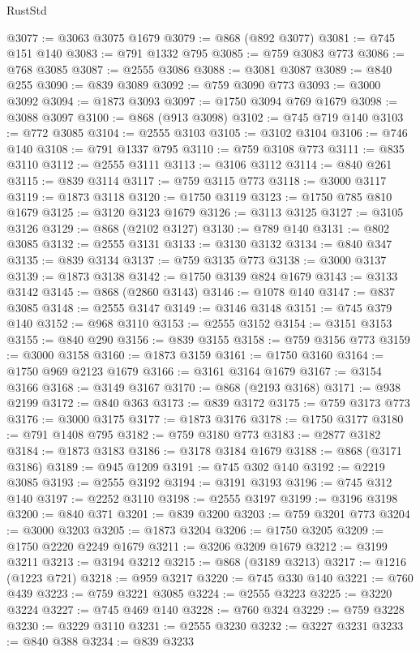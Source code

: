 \begin{lexlean}{RustStd}
\begin{coremodule}
@3077 := @3063 @3075 @1679
@3079 := @868 (@892 @3077)
@3081 := @745 @151 @140
@3083 := @791 @1332 @795
@3085 := @759 @3083 @773
@3086 := @768 @3085
@3087 := @2555 @3086
@3088 := @3081 @3087
@3089 := @840 @255
@3090 := @839 @3089
@3092 := @759 @3090 @773
@3093 := @3000 @3092
@3094 := @1873 @3093
@3097 := @1750 @3094 @769 @1679
@3098 := @3088 @3097
@3100 := @868 (@913 @3098)
@3102 := @745 @719 @140
@3103 := @772 @3085
@3104 := @2555 @3103
@3105 := @3102 @3104
@3106 := @746 @140
@3108 := @791 @1337 @795
@3110 := @759 @3108 @773
@3111 := @835 @3110
@3112 := @2555 @3111
@3113 := @3106 @3112
@3114 := @840 @261
@3115 := @839 @3114
@3117 := @759 @3115 @773
@3118 := @3000 @3117
@3119 := @1873 @3118
@3120 := @1750 @3119
@3123 := @1750 @785 @810 @1679
@3125 := @3120 @3123 @1679
@3126 := @3113 @3125
@3127 := @3105 @3126
@3129 := @868 (@2102 @3127)
@3130 := @789 @140
@3131 := @802 @3085
@3132 := @2555 @3131
@3133 := @3130 @3132
@3134 := @840 @347
@3135 := @839 @3134
@3137 := @759 @3135 @773
@3138 := @3000 @3137
@3139 := @1873 @3138
@3142 := @1750 @3139 @824 @1679
@3143 := @3133 @3142
@3145 := @868 (@2860 @3143)
@3146 := @1078 @140
@3147 := @837 @3085
@3148 := @2555 @3147
@3149 := @3146 @3148
@3151 := @745 @379 @140
@3152 := @968 @3110
@3153 := @2555 @3152
@3154 := @3151 @3153
@3155 := @840 @290
@3156 := @839 @3155
@3158 := @759 @3156 @773
@3159 := @3000 @3158
@3160 := @1873 @3159
@3161 := @1750 @3160
@3164 := @1750 @969 @2123 @1679
@3166 := @3161 @3164 @1679
@3167 := @3154 @3166
@3168 := @3149 @3167
@3170 := @868 (@2193 @3168)
@3171 := @938 @2199
@3172 := @840 @363
@3173 := @839 @3172
@3175 := @759 @3173 @773
@3176 := @3000 @3175
@3177 := @1873 @3176
@3178 := @1750 @3177
@3180 := @791 @1408 @795
@3182 := @759 @3180 @773
@3183 := @2877 @3182
@3184 := @1873 @3183
@3186 := @3178 @3184 @1679
@3188 := @868 (@3171 @3186)
@3189 := @945 @1209
@3191 := @745 @302 @140
@3192 := @2219 @3085
@3193 := @2555 @3192
@3194 := @3191 @3193
@3196 := @745 @312 @140
@3197 := @2252 @3110
@3198 := @2555 @3197
@3199 := @3196 @3198
@3200 := @840 @371
@3201 := @839 @3200
@3203 := @759 @3201 @773
@3204 := @3000 @3203
@3205 := @1873 @3204
@3206 := @1750 @3205
@3209 := @1750 @2220 @2249 @1679
@3211 := @3206 @3209 @1679
@3212 := @3199 @3211
@3213 := @3194 @3212
@3215 := @868 (@3189 @3213)
@3217 := @1216 (@1223 @721)
@3218 := @959 @3217
@3220 := @745 @330 @140
@3221 := @760 @439
@3223 := @759 @3221 @3085
@3224 := @2555 @3223
@3225 := @3220 @3224
@3227 := @745 @469 @140
@3228 := @760 @324
@3229 := @759 @3228
@3230 := @3229 @3110
@3231 := @2555 @3230
@3232 := @3227 @3231
@3233 := @840 @388
@3234 := @839 @3233

\end{coremodule}
\end{lexlean}
